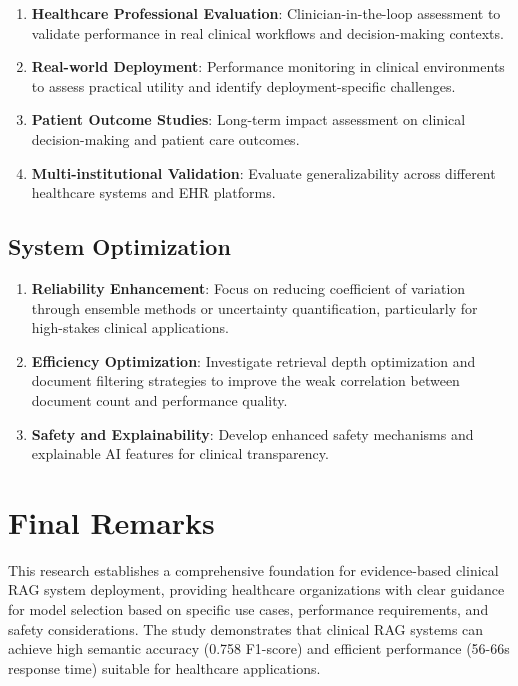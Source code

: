 \begin{enumerate}
    \item \textbf{Healthcare Professional Evaluation}: Clinician-in-the-loop assessment to validate performance in real clinical workflows and decision-making contexts.

    \item \textbf{Real-world Deployment}: Performance monitoring in clinical environments to assess practical utility and identify deployment-specific challenges.

    \item \textbf{Patient Outcome Studies}: Long-term impact assessment on clinical decision-making and patient care outcomes.

    \item \textbf{Multi-institutional Validation}: Evaluate generalizability across different healthcare systems and EHR platforms.
\end{enumerate}

\subsection{System Optimization}

\begin{enumerate}
    \item \textbf{Reliability Enhancement}: Focus on reducing coefficient of variation through ensemble methods or uncertainty quantification, particularly for high-stakes clinical applications.

    \item \textbf{Efficiency Optimization}: Investigate retrieval depth optimization and document filtering strategies to improve the weak correlation between document count and performance quality.

    \item \textbf{Safety and Explainability}: Develop enhanced safety mechanisms and explainable AI features for clinical transparency.
\end{enumerate}
\newpage
\section{Final Remarks}

This research establishes a comprehensive foundation for evidence-based clinical RAG system deployment, providing healthcare organizations with clear guidance for model selection based on specific use cases, performance requirements, and safety considerations. The study demonstrates that clinical RAG systems can achieve high semantic accuracy (0.758 F1-score) and efficient performance (56-66s response time) suitable for healthcare applications.

